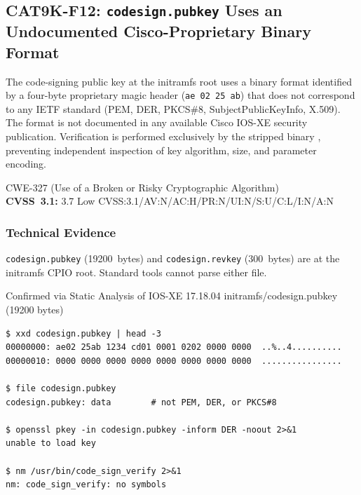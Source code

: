 \documentclass[11pt,a4paper]{article}
\begin{document}
\subsection{CAT9K-F12: \texorpdfstring{\texttt{codesign.pubkey}}{codesign.pubkey} Uses an Undocumented Cisco-Proprietary Binary Format}

\begin{overviewbox}
The code-signing public key at the initramfs root uses a binary format identified by
a four-byte proprietary magic header (\texttt{ae 02 25 ab}) that does not correspond
to any IETF standard (PEM, DER, PKCS\#8, SubjectPublicKeyInfo, X.509). The format is
not documented in any available Cisco IOS-XE security publication. Verification is
performed exclusively by the stripped binary ,
preventing independent inspection of key algorithm, size, and parameter encoding.

CWE-327 (Use of a Broken or Risky Cryptographic Algorithm)\\
\textbf{CVSS~3.1:} 3.7 Low \quad CVSS:3.1/AV:N/AC:H/PR:N/UI:N/S:U/C:L/I:N/A:N
\end{overviewbox}

\subsubsection{Technical Evidence}

\texttt{codesign.pubkey} (19200~bytes) and \texttt{codesign.revkey} (300~bytes) are
at the initramfs CPIO root. Standard tools cannot parse either file.

\begin{pocbox}{Confirmed via Static Analysis of IOS-XE 17.18.04 initramfs/codesign.pubkey (19200 bytes)}
\begin{lstlisting}
$ xxd codesign.pubkey | head -3
00000000: ae02 25ab 1234 cd01 0001 0202 0000 0000  ..%..4..........
00000010: 0000 0000 0000 0000 0000 0000 0000 0000  ................

$ file codesign.pubkey
codesign.pubkey: data        # not PEM, DER, or PKCS#8

$ openssl pkey -in codesign.pubkey -inform DER -noout 2>&1
unable to load key

$ nm /usr/bin/code_sign_verify 2>&1
nm: code_sign_verify: no symbols
\end{lstlisting}
\end{pocbox}
\end{document}
